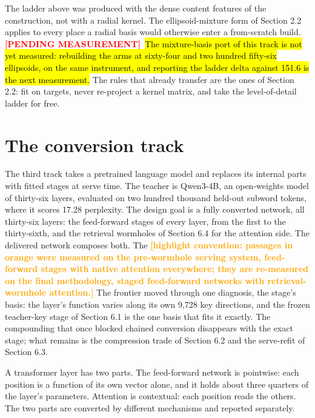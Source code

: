 \documentclass[11pt]{article}
\newcommand{\pending}[1]{%
  \textcolor{red}{\textbf{[PENDING MEASUREMENT]}}~\hl{#1}}
\begin{document}
The ladder above was produced with the dense content features of
the construction, not with a radial kernel. The ellipsoid-mixture
form of Section 2.2 applies to every place a radial basis would
otherwise enter a from-scratch build. \pending{The mixture-basis
port of this track is not yet measured: rebuilding the arms at
sixty-four and two hundred fifty-six ellipsoids, on the same
instrument, and reporting the ladder delta against 151.6 is the
next measurement.} The rules that already transfer are the ones of
Section 2.2: fit on targets, never re-project a kernel matrix, and
take the level-of-detail ladder for free.

\section{The conversion track}

The third track takes a pretrained language model and replaces its
internal parts with fitted stages at serve time. The teacher is
Qwen3-4B, an open-weights model of thirty-six layers, evaluated on
two hundred thousand held-out subword tokens, where it scores 17.28
perplexity. The design goal is a fully converted network, all
thirty-six layers: the feed-forward stages of every layer, from
the first to the thirty-sixth, and the retrieval wormholes of
Section 6.4 for the attention side. The delivered network composes
both. The
\textcolor{orange}{\textbf{[highlight convention: passages in
orange were measured on the pre-wormhole serving system,
feed-forward stages with native attention everywhere; they are
re-measured on the final methodology, staged feed-forward
networks with retrieval-wormhole attention.]}} The
frontier moved through one diagnosis, the stage's basis: the
layer's function varies along its own 9,728 key directions, and
the frozen teacher-key stage of Section 6.1 is the one basis that
fits it exactly. The compounding that once blocked chained
conversion disappears with the exact stage; what remains is the
compression trade of Section 6.2 and the serve-refit of
Section 6.3.

A transformer layer has two parts. The feed-forward network is
pointwise: each position is a function of its own vector alone, and
it holds about three quarters of the layer's parameters. Attention
is contextual: each position reads the others. The two parts are
converted by different mechanisms and reported separately.
\end{document}
